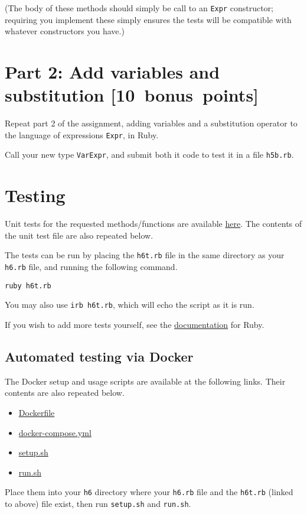\documentclass[11pt]{article}
\begin{document}
(The body of these methods should simply be call to an \texttt{Expr} constructor;
requiring you implement these simply ensures the tests will be
compatible with whatever constructors you have.)

\section*{Part 2: Add variables and substitution           [10 bonus points]}
\label{sec:org020cb0d}
Repeat part 2 of the assignment,
adding variables and a substitution operator to the language
of expressions \texttt{Expr}, in Ruby.

Call your new type \texttt{VarExpr}, and submit both it code to test it
in a file \texttt{h5b.rb}.

\section*{Testing}
\label{sec:orgfa7449e}
Unit tests for the requested methods/functions
are available \href{./testing/h6/h6t.rb}{here}.
The contents of the unit test file are also repeated below.

The tests can be run by placing the \texttt{h6t.rb} file
in the same directory as your \texttt{h6.rb} file, and
running the following command.
\begin{verbatim}
ruby h6t.rb
\end{verbatim}
You may also use \texttt{irb h6t.rb}, which will echo the script
as it is run.

If you wish to add more tests yourself,
see the \href{https://en.wikibooks.org/wiki/Ruby\_Programming/Unit\_testing}{documentation}
for Ruby.

\subsection*{Automated testing via Docker}
\label{sec:org69b21b1}
The Docker setup and usage scripts are available at the following links.
Their contents are also repeated below.
\begin{itemize}
\item \href{./testing/h6/Dockerfile}{Dockerfile}
\item \href{./testing/h6/docker-compose.yml}{docker-compose.yml}
\item \href{./testing/h6/setup.sh}{setup.sh}
\item \href{./testing/h6/run.sh}{run.sh}
\end{itemize}
Place them into your \texttt{h6} directory where your \texttt{h6.rb} file
and the \texttt{h6t.rb} (linked to above) file exist,
then run \texttt{setup.sh} and \texttt{run.sh}.
\end{document}
